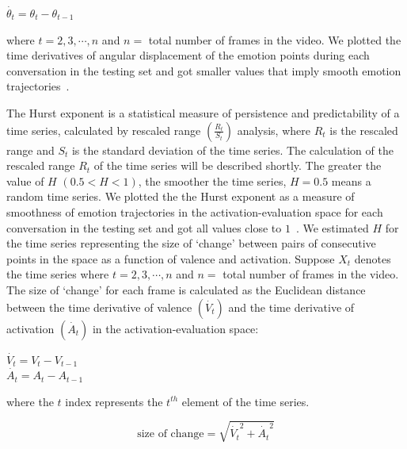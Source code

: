 \documentclass[10pt,journal,cspaper,compsoc]{IEEEtran}
\begin{document}
\begin{center}
$\dot{\theta_{t}}=\theta_{t}-\theta_{t-1}$  \\
\end{center}

\noindent where $t=2,3,\cdots,n$ and $n=$ total number of frames in the video. We plotted the time derivatives of angular displacement of the emotion points during each conversation in the testing set and got smaller values that imply smooth emotion trajectories~\cite{ayesha hakim analysis paper}.

The Hurst exponent is a statistical measure of persistence and predictability of a time series, calculated by rescaled range $\left(\frac{R_{t}}{S_{t}}\right)$ analysis, where $R_{t}$ is the rescaled range and $S_{t}$ is the standard deviation of the time series. The calculation of the rescaled range $R_{t}$ of the time series will be described shortly. The greater the value of $H$ $(0.5<H<1)$, the smoother the time series, $H=0.5$ means a random time series. We plotted the the Hurst exponent as a measure of smoothness of emotion trajectories in the activation-evaluation space for each conversation in the testing set and got all values close to $1$~\cite{ayesha hakim analysis paper}. We estimated $H$ for the time series representing the size of `change' between pairs of consecutive points in the space as a function of valence and activation. Suppose $X_{t}$ denotes the time series where $t=2,3,\cdots,n$ and $n=$ total number of frames in the video. The size of `change' for each frame is calculated as the Euclidean distance between the time derivative of valence $(\dot{V_{t}})$ and the time derivative of activation $(\dot{A_{t}})$ in the activation-evaluation space:

\begin{center}
$\dot{V_{t}}= V_{t}-V_{t-1} $  \\
$\dot{A_{t}}= A_{t}-A_{t-1} $ \\
\end{center}

\noindent where the $t$ index represents the $t^{th}$ element of the time series.

\begin{equation}
\label{eq_size_of_change}
\text{size of change}=\sqrt{\dot{V_{t}}^{2}+\dot{A_{t}}^{2}}
\end{equation}
\end{document}
